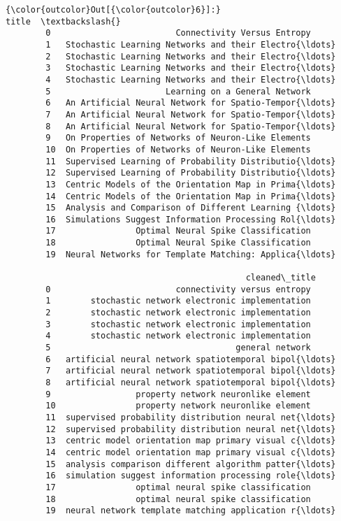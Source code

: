 \documentclass[11pt]{article}
\begin{document}
\begin{Verbatim}[commandchars=\\\{\}]
{\color{outcolor}Out[{\color{outcolor}6}]:}                                                 title  \textbackslash{}
        0                         Connectivity Versus Entropy   
        1   Stochastic Learning Networks and their Electro{\ldots}   
        2   Stochastic Learning Networks and their Electro{\ldots}   
        3   Stochastic Learning Networks and their Electro{\ldots}   
        4   Stochastic Learning Networks and their Electro{\ldots}   
        5                       Learning on a General Network   
        6   An Artificial Neural Network for Spatio-Tempor{\ldots}   
        7   An Artificial Neural Network for Spatio-Tempor{\ldots}   
        8   An Artificial Neural Network for Spatio-Tempor{\ldots}   
        9   On Properties of Networks of Neuron-Like Elements   
        10  On Properties of Networks of Neuron-Like Elements   
        11  Supervised Learning of Probability Distributio{\ldots}   
        12  Supervised Learning of Probability Distributio{\ldots}   
        13  Centric Models of the Orientation Map in Prima{\ldots}   
        14  Centric Models of the Orientation Map in Prima{\ldots}   
        15  Analysis and Comparison of Different Learning {\ldots}   
        16  Simulations Suggest Information Processing Rol{\ldots}   
        17                Optimal Neural Spike Classification   
        18                Optimal Neural Spike Classification   
        19  Neural Networks for Template Matching: Applica{\ldots}   
        
                                                cleaned\_title  
        0                         connectivity versus entropy  
        1        stochastic network electronic implementation  
        2        stochastic network electronic implementation  
        3        stochastic network electronic implementation  
        4        stochastic network electronic implementation  
        5                                     general network  
        6   artificial neural network spatiotemporal bipol{\ldots}  
        7   artificial neural network spatiotemporal bipol{\ldots}  
        8   artificial neural network spatiotemporal bipol{\ldots}  
        9                 property network neuronlike element  
        10                property network neuronlike element  
        11  supervised probability distribution neural net{\ldots}  
        12  supervised probability distribution neural net{\ldots}  
        13  centric model orientation map primary visual c{\ldots}  
        14  centric model orientation map primary visual c{\ldots}  
        15  analysis comparison different algorithm patter{\ldots}  
        16  simulation suggest information processing role{\ldots}  
        17                optimal neural spike classification  
        18                optimal neural spike classification  
        19  neural network template matching application r{\ldots}  
\end{Verbatim}
            
\end{document}
